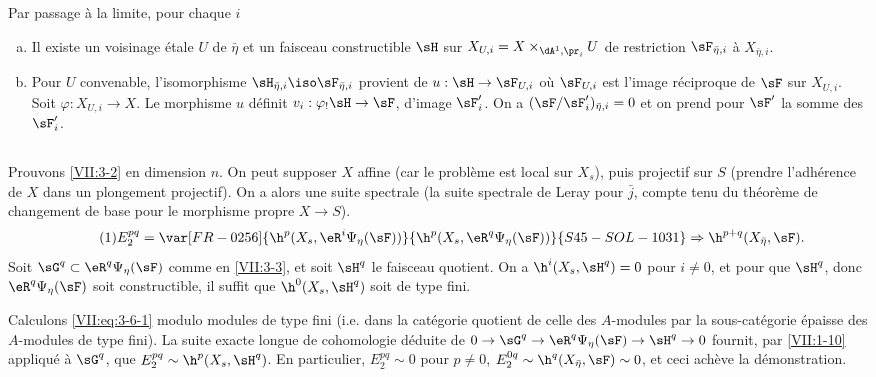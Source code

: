 Par passage à la limite, pour chaque $i$
\begin{enumerate}[a)]
  \item Il existe un voisinage étale $U$ de $\bar\eta$ et un faisceau 
    constructible $\sH$ sur $X_{U,i} = X\times_{\dA^1,\pr_i} U$ de restriction 
    $\sF_{\bar\eta,i}$ à $X_{\bar\eta,i}$. 
  \item Pour $U$ convenable, l'isomorphisme 
    $\sH_{\bar\eta,i} \iso \sF_{\bar\eta,i}$ provient de $u:\sH\to \sF_{U,i}$ 
    où $\sF_{U,i}$ est l'image réciproque de $\sF$ sur $X_{U,i}$. Soit 
    $\varphi:X_{U,i} \to X$. Le morphisme $u$ définit 
    $v_i:\varphi_! \sH \to \sF$, d'image $\sF_i'$. On a 
    $(\sF/\sF_i')_{\bar\eta,i} = 0$ et on prend pour $\sF'$ la somme des 
    $\sF_i'$. 
\end{enumerate}





\subsection{}\label{VII:3-6}

Prouvons \ref{VII:3-2} en dimension $n$. On peut supposer $X$ affine (car le 
problème est local sur $X_s$), puis projectif sur $S$ (prendre l'adhérence 
de $X$ dans un plongement projectif). On a alors une suite spectrale 
 (la suite spectrale de Leray pour $\bar j$, compte tenu du 
théorème de changement de base pour le morphisme propre $X\to S$). 
\begin{equation*}\tag{1}\label{VII:eq:3-6-1}
  E_2^{p q} = \var[FR-0256]{\h^p(X_s,\eR^i\Psi_\eta(\sF))}{\h^p(X_s,\eR^q\Psi_\eta(\sF))}{S45-SOL-1031} \Rightarrow \h^{p+q}(X_{\bar\eta},\sF) \text{.} 
\end{equation*}
Soit $\sG^q\subset \eR^q \Psi_\eta(\sF)$ comme en \ref{VII:3-3}, et soit 
$\sH^q$ le faisceau quotient. On a $\h^i(X_s,\sH^q)=0$ pour $i\ne 0$, et pour 
que $\sH^q$, donc $\eR^q\Psi_\eta(\sF)$ soit constructible, il suffit que 
$\h^0(X_s,\sH^q)$ soit de type fini. 

Calculons \eqref{VII:eq:3-6-1} modulo modules de type fini (i.e. dans la 
catégorie quotient de celle des $A$-modules par la sous-catégorie épaisse 
des $A$-modules de type fini). La suite exacte longue de cohomologie déduite 
de $0 \to \sG^q \to \eR^q\Psi_\eta(\sF) \to \sH^q \to 0$ fournit, par 
\ref{VII:1-10} appliqué à $\sG^q$, que $E_2^{p q} \sim \h^p(X_s,\sH^q)$. 
En particulier, $E_2^{p q}\sim 0$ pour $p\ne 0$, 
$E_2^{0 q}\sim \h^q(X_{\bar\eta},\sF) \sim 0$, et ceci achève la 
démonstration. 

